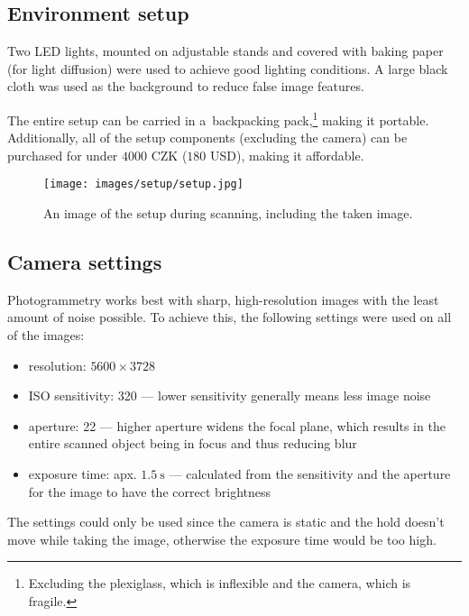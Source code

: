 \subsection{Environment setup}
Two LED lights, mounted on adjustable stands and covered with baking paper (for light diffusion) were used to achieve good lighting conditions.
A large black cloth was used as the background to reduce false image features.

The entire setup can be carried in a~backpacking pack,\footnote{Excluding the plexiglass, which is inflexible and the camera, which is fragile.} making it portable.
Additionally, all of the setup components (excluding the camera) can be purchased for under $4000$ CZK ($180$ USD), making it affordable.

\begin{figure}
	\centering
	\texttt{[image: images/setup/setup.jpg]}
	\caption{An image of the setup during scanning, including the taken image.}
	\label{fig:setup}
\end{figure}

\subsection{Camera settings}\label{sec:camsettings}
Photogrammetry works best with sharp, high-resolution images with the least amount of noise possible.
To achieve this, the following settings were used on all of the images:
\begin{itemize}
	\item resolution: $5600 \times 3728$
	\item ISO sensitivity: 320 --- lower sensitivity generally means less image noise
	\item aperture: 22 --- higher aperture widens the focal plane, which results in the entire scanned object being in focus and thus reducing blur
	\item exposure time: apx. $\SI{1.5}{\second}$ --- calculated from the sensitivity and the aperture for the image to have the correct brightness
\end{itemize}

The settings could only be used since the camera is static and the hold doesn't move while taking the image, otherwise the exposure time would be too high.

